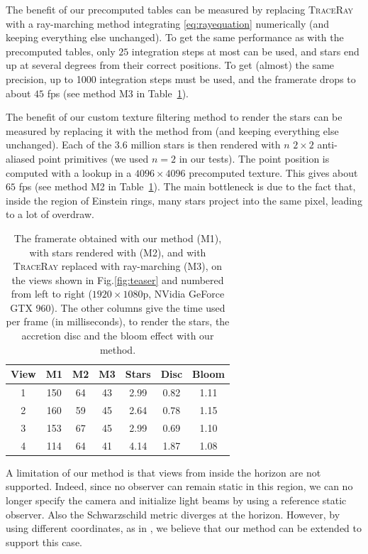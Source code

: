 \documentclass{document}
\begin{document}
The benefit of our precomputed tables can be measured by replacing 
\textsc{TraceRay} with a ray-marching method integrating \eqref{eq:rayequation} 
numerically (and keeping everything else unchanged). To get the same 
performance as with the precomputed tables, only $25$ integration steps at most 
can be used, and stars end up at several degrees from their correct positions. 
To get (almost) the same precision, up to 1000 integration steps must be used, 
and the framerate drops to about $45$ fps (see method M3 in 
Table~\ref{table:perf}).

The benefit of our custom texture filtering method to render the stars can be 
measured by replacing it with the method from \cite{Muller2010} (and keeping 
everything else unchanged). Each of the $3.6$ million stars is then 
rendered with $n$ $2 \times 2$ anti-aliased point primitives (we used $n = 2$ 
in our tests). The point position is computed with a lookup in a $4096 \times 
4096$ precomputed texture. This gives about $65$ fps (see method M2 in 
Table~\ref{table:perf}). The main bottleneck is due to the fact that, inside 
the region of Einstein rings, many stars project into the same pixel, leading 
to a lot of overdraw.

\begin{table}
	\centering
	\begin{tabular}{|c|c|c|c|c|c|c|}
		\hline
		View & M1 & M2 & M3 & Stars & Disc & Bloom \\
		\hline
		\hline
		1 & 150 & 64 & 43 & 2.99 & 0.82 & 1.11 \\
		2 & 160 & 59 & 45 & 2.64 & 0.78 & 1.15 \\
		3 & 153 & 67 & 45 & 2.99 & 0.69 & 1.10 \\
		4 & 114 & 64 & 41 & 4.14 & 1.87 & 1.08 \\
		\hline
	\end{tabular}
	\caption{\label{table:perf} The framerate obtained with our method (M1), with 
	stars rendered with \cite{Muller2010} (M2), and with \textsc{TraceRay} 
	replaced with ray-marching (M3), on the views shown in Fig.\ref{fig:teaser} 
	and numbered from left to right ($1920\times1080$p, NVidia GeForce GTX 960). 
	The other columns give the time used per frame (in milliseconds), to render 
	the stars, the accretion disc and the bloom effect with our method.}
\end{table}

A limitation of our method is that views from inside the horizon are not 
supported. Indeed, since no observer can remain static in this region, we can 
no longer specify the camera and initialize light beams by using a reference 
static observer. Also the Schwarzschild metric diverges at the horizon. 
However, by using different coordinates, as in \cite{Muller2010}, we believe 
that our method can be extended to support this case.
\end{document}

